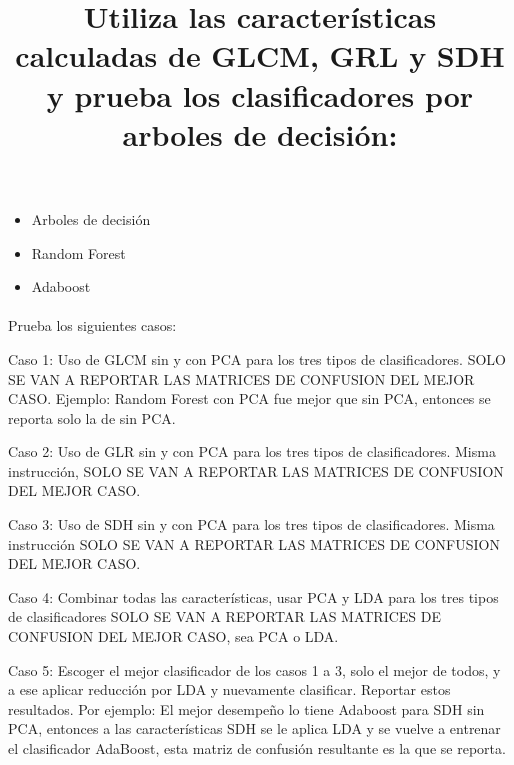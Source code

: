 \documentclass[
  letterpaper,
  DIV=11,
  numbers=noendperiod]{scrartcl}
\title{Utiliza las características calculadas de GLCM, GRL y SDH y
prueba los clasificadores por arboles de decisión:}
\author{}
\date{}
\makeatletter
\let\oldparagraph\paragraph
\renewcommand{\paragraph}{
    \@ifstar
      \xxxParagraphStar
      \xxxParagraphNoStar
  }
\newcommand{\xxxParagraphStar}[1]{\oldparagraph*{#1}\mbox{}}
\newcommand{\xxxParagraphNoStar}[1]{\oldparagraph{#1}\mbox{}}
\providecommand{\tightlist}{%
  \setlength{\itemsep}{0pt}\setlength{\parskip}{0pt}}
\makeatother
\begin{document}
\maketitle


\begin{itemize}
\tightlist
\item
  Arboles de decisión
\item
  Random Forest
\item
  Adaboost
\end{itemize}

\paragraph{Prueba los siguientes
casos:}\label{prueba-los-siguientes-casos}

Caso 1: Uso de GLCM sin y con PCA para los tres tipos de clasificadores.
SOLO SE VAN A REPORTAR LAS MATRICES DE CONFUSION DEL MEJOR CASO.
Ejemplo: Random Forest con PCA fue mejor que sin PCA, entonces se
reporta solo la de sin PCA.

Caso 2: Uso de GLR sin y con PCA para los tres tipos de clasificadores.
Misma instrucción, SOLO SE VAN A REPORTAR LAS MATRICES DE CONFUSION DEL
MEJOR CASO.

Caso 3: Uso de SDH sin y con PCA para los tres tipos de clasificadores.
Misma instrucción SOLO SE VAN A REPORTAR LAS MATRICES DE CONFUSION DEL
MEJOR CASO.

Caso 4: Combinar todas las características, usar PCA y LDA para los tres
tipos de clasificadores SOLO SE VAN A REPORTAR LAS MATRICES DE CONFUSION
DEL MEJOR CASO, sea PCA o LDA.

Caso 5: Escoger el mejor clasificador de los casos 1 a 3, solo el mejor
de todos, y a ese aplicar reducción por LDA y nuevamente clasificar.
Reportar estos resultados. Por ejemplo: El mejor desempeño lo tiene
Adaboost para SDH sin PCA, entonces a las características SDH se le
aplica LDA y se vuelve a entrenar el clasificador AdaBoost, esta matriz
de confusión resultante es la que se reporta.
\end{document}
